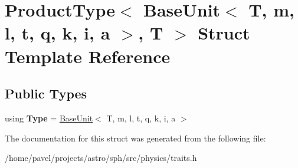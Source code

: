 \hypertarget{structProductType_3_01BaseUnit_3_01T_00_01m_00_01l_00_01t_00_01q_00_01k_00_01i_00_01a_01_4_00_01T_01_4}{}\section{Product\+Type$<$ Base\+Unit$<$ T, m, l, t, q, k, i, a $>$, T $>$ Struct Template Reference}
\label{structProductType_3_01BaseUnit_3_01T_00_01m_00_01l_00_01t_00_01q_00_01k_00_01i_00_01a_01_4_00_01T_01_4}
\subsection*{Public Types}
\begin{DoxyCompactItemize}
\item 
\hypertarget{structProductType_3_01BaseUnit_3_01T_00_01m_00_01l_00_01t_00_01q_00_01k_00_01i_00_01a_01_4_00_01T_01_4_a15e9f956f2cc15a40fd7ff12034afcf1}{}\label{structProductType_3_01BaseUnit_3_01T_00_01m_00_01l_00_01t_00_01q_00_01k_00_01i_00_01a_01_4_00_01T_01_4_a15e9f956f2cc15a40fd7ff12034afcf1} 
using {\bfseries Type} = \hyperlink{classBaseUnit}{Base\+Unit}$<$ T, m, l, t, q, k, i, a $>$
\end{DoxyCompactItemize}


The documentation for this struct was generated from the following file\+:\begin{DoxyCompactItemize}
\item 
/home/pavel/projects/astro/sph/src/physics/traits.\+h\end{DoxyCompactItemize}
